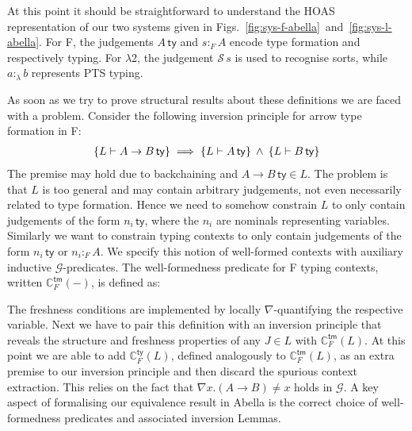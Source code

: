 \documentclass[a4paper,UKenglish]{lipics-v2016}
\newcommand{\ms}{\,}
\newcommand{\mrel}[1]{\mathrel{\ms #1 \ms}}
\newcommand{\mAnd}{\mrel{\wedge}}
\newcommand{\SysL}{$\lambda$2\xspace}
\newcommand{\ty}{\mathsf{ty}}
\newcommand{\tm}{\mathsf{tm}}
\newcommand{\istyFh}[1]{\ensuremath{#1\ms\mathsf{ty}}}
\newcommand{\typingFh}[2]{\ensuremath{#1 \mathbin{:_{F}} #2}}
\newcommand{\sortLh}[1]{\ensuremath{\mathcal{S}\ms#1}}
\newcommand{\typingLh}[2]{\ensuremath{#1 \mathbin{:_{\lambda}} #2}}
\newcommand{\emptyctx}{\ensuremath{\bullet}}
\theoremstyle{plain}
\begin{document}
At this point it should be straightforward to understand the HOAS representation of our two systems given in Figs.~\ref{fig:sys-f-abella}~and~\ref{fig:sys-l-abella}.
For F, the judgements $\istyFh{A}$ and $\typingFh{s}{A}$ encode type formation and respectively typing.
For \SysL, the judgement $\sortLh{s}$ is used to recognise sorts, while $\typingLh{a}{b}$ represents PTS typing.

\newcommand{\ac}[3]{\ensuremath{\mathbb{C}_{#1}^{#2} (#3)}}
\newcommand{\acFty}[1]{\ac{F}{\ty}{#1}}
\newcommand{\acFtm}[1]{\ac{F}{\tm}{#1}}
As soon as we try to prove structural results about these definitions we are faced with a problem.
Consider the following inversion principle for arrow type formation in F:
\begin{align*}
  \aj{L}{\istyFh{A \to B}} \implies \aj{L}{\istyFh{A}} \mAnd \aj{L}{\istyFh{B}}
\end{align*}
The premise may hold due to backchaining and $\istyFh{A \to B} \in L$.
The problem is that $L$ is too general and may contain arbitrary judgements, not even necessarily related to type formation.
Hence we need to somehow constrain $L$ to only contain judgements of the form $\istyFh{n_i}$, where the $n_i$ are nominals representing variables.
Similarly we want to constrain typing contexts to only contain judgements of the form $\istyFh{n_i}$ or $\typingFh{n_i}{A}$.
We specify this notion of well-formed contexts  with auxiliary inductive $\mathcal{G}$-predicates.
The well-formedness predicate for F typing contexts, written $\acFtm{-}$, is defined as:
The freshness conditions are implemented by locally $\nabla$-quantifying the respective variable.
Next we have to pair this definition with an inversion principle that reveals the structure and freshness properties of any $J \in L$ with $\acFtm{L}$.
At this point we are able to add $\acFty{L}$, defined analogously to $\acFtm{L}$, as an extra premise to our inversion principle and then discard the spurious context extraction.
This relies on the fact that $\nabla x . (A \to B) \neq x$ holds in $\mathcal{G}$.
A key aspect of formalising our equivalence result in Abella is the correct choice of well-formedness predicates and associated inversion Lemmas.
\end{document}
